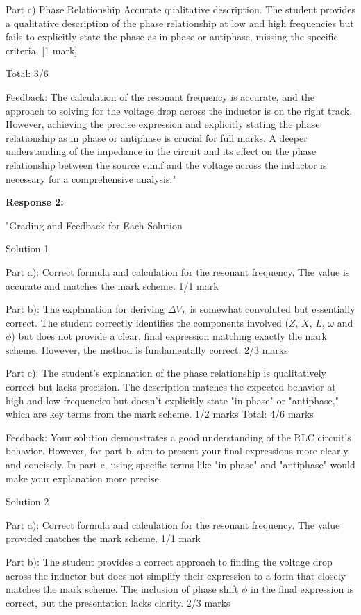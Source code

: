 \documentclass[a4paper,11pt]{article}
\begin{document}
Part c) Phase Relationship
Accurate qualitative description. The student provides a qualitative description of the phase relationship at low and high frequencies but fails to explicitly state the phase as in phase or antiphase, missing the specific criteria. [1 mark]

Total: 3/6

Feedback: The calculation of the resonant frequency is accurate, and the approach to solving for the voltage drop across the inductor is on the right track. However, achieving the precise expression and explicitly stating the phase relationship as in phase or antiphase is crucial for full marks. A deeper understanding of the impedance in the circuit and its effect on the phase relationship between the source e.m.f and the voltage across the inductor is necessary for a comprehensive analysis."

\textbf{Response 2:}

"Grading and Feedback for Each Solution

Solution 1

Part a): Correct formula and calculation for the resonant frequency. The value is accurate and matches the mark scheme. 1/1 mark

Part b): The explanation for deriving \(\Delta V_L\) is somewhat convoluted but essentially correct. The student correctly identifies the components involved (\(Z\), \(X\), \(L\), \(\omega\) and \(\phi\)) but does not provide a clear, final expression matching exactly the mark scheme. However, the method is fundamentally correct. 2/3 marks

Part c): The student's explanation of the phase relationship is qualitatively correct but lacks precision. The description matches the expected behavior at high and low frequencies but doesn't explicitly state "in phase" or "antiphase," which are key terms from the mark scheme. 1/2 marks
Total: 4/6 marks

Feedback: Your solution demonstrates a good understanding of the RLC circuit's behavior. However, for part b, aim to present your final expressions more clearly and concisely. In part c, using specific terms like "in phase" and "antiphase" would make your explanation more precise.

Solution 2

Part a): Correct formula and calculation for the resonant frequency. The value provided matches the mark scheme. 1/1 mark

Part b): The student provides a correct approach to finding the voltage drop across the inductor but does not simplify their expression to a form that closely matches the mark scheme. The inclusion of phase shift \(\phi\) in the final expression is correct, but the presentation lacks clarity. 2/3 marks
\end{document}
